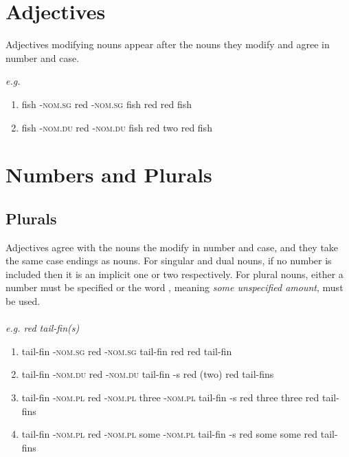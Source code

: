 \documentclass{article}
\newcommand{\h}{{$^h$}}
\newcommand{\N}{{$\varnothing$}}
\begin{document}
\section{Adjectives}
Adjectives modifying nouns appear after the nouns they modify and agree in number and case.

\textit{e.g.}
\begin{enumerate}
	\item
\trigloss[preamble={\textipa{S:eS: SlIms} }]
	{\textipa{S:eS:} -\N{} \textipa{SlIms} -\N{} }
	{fish -\textsc{nom.sg} red -\textsc{nom.sg}}
	{fish {} red {} }
	{red fish}
	\item
{}
	{fish -\textsc{nom.du} red -\textsc{nom.du}}
	{fish {} red {} }
	{two red fish}

\end{enumerate}

\section{Numbers and Plurals}

\subsection{Plurals}
Adjectives agree with the nouns the modify in number and case, and they take the same case endings as nouns.  For singular and dual nouns, if no number is included then it is an implicit one or two respectively.  For plural nouns, either a number must be specified or the word , meaning \textit{some unspecified amount}, must be used.\\
\\
\textit{e.g. red tail-fin(s)}

\begin{enumerate}
	\item 
		\trigloss[preamble={\textipa{saIp\h{} SlIms} }]
	{\textipa{saIph\h{}} -\N{} \textipa{SlIms} -\N{} }
	{tail-fin -\textsc{nom.sg} red -\textsc{nom.sg}}
	{tail-fin {} red {} }
	{red tail-fin}
	\item 
	{tail-fin -\textsc{nom.du} red -\textsc{nom.du}}
	{tail-fin -s red {} }
	{(two) red tail-fins}
	\item
	{tail-fin -\textsc{nom.pl} red -\textsc{nom.pl} three -\textsc{nom.pl}}
	{tail-fin -s red {} three {}}
	{three red tail-fins}
	\item 
	{tail-fin -\textsc{nom.pl} red -\textsc{nom.pl} some -\textsc{nom.pl}}
	{tail-fin -s red {} some {}}
	{some red tail-fins}
\end{enumerate}
\end{document}
